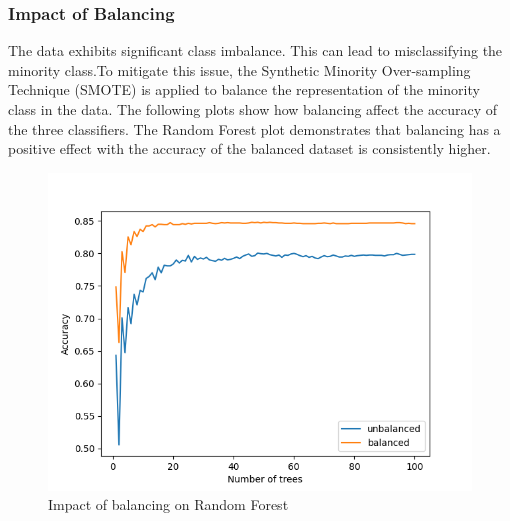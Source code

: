 \documentclass{article}
\begin{document}
\subsubsection{Impact of Balancing}
The data exhibits significant class imbalance. This can lead to misclassifying the minority class.To mitigate this issue, the Synthetic Minority Over-sampling Technique (SMOTE) is applied to balance the representation of the minority class in the data.
The following plots show how balancing affect the accuracy of the three classifiers. The Random Forest plot demonstrates that balancing has a positive effect with the accuracy of the balanced dataset is consistently higher.
\begin{figure}[H]
\centering
\includegraphics[width=0.5\linewidth]{RTA_balancing.png}
\caption{\label{fig:hist:price}Impact of balancing on Random Forest}
\end{figure}
\end{document}
